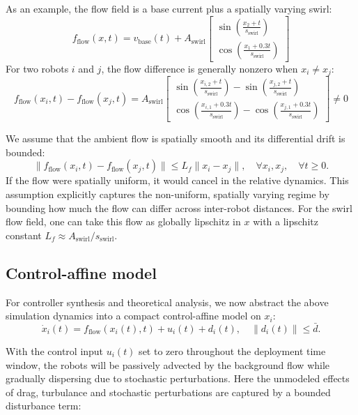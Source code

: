 \documentclass[conference]{IEEEconf}
\theoremstyle{plain}
\begin{document}
As an example, the flow field is a base current plus a spatially varying swirl:
\begin{equation*}
f_{\text{flow}}(x,t) = v_{\text{base}}(t) + A_{\text{swirl}}
\begin{bmatrix}
    \sin \! \left( \tfrac{x_2 + t}{s_{\text{swirl}}} \right) \\
    \cos \! \left( \tfrac{x_1 + 0.3t}{s_{\text{swirl}}} \right)
\end{bmatrix}
\end{equation*}
For two robots $i$ and $j$, the flow difference is generally nonzero when $x_{i} \neq x_{j}$:
\begin{equation*}
f_{\text{flow}}(x_i, t) - f_{\text{flow}}(x_j, t) = A_{\text{swirl}}
\left[ \begin{smallmatrix}
    \sin \! \left( \frac{x_{i,2} + t}{s_{\text{swirl}}} \right) - \sin \! \left( \frac{x_{j,2} + t}{s_{\text{swirl}}} \right) \\
    \cos \! \left( \frac{x_{i,1} + 0.3t}{s_{\text{swirl}}} \right) - \cos \! \left( \frac{x_{j,1} + 0.3t}{s_{\text{swirl}}} \right)
\end{smallmatrix} \right] \neq 0
\end{equation*}

We assume that the ambient flow is spatially smooth and its differential drift is bounded:
$$
\|f_{\text{flow}}(x_i, t) - f_{\text{flow}}(x_j, t)\| \le L_f \|x_i - x_j\|, \quad \forall x_i, x_j, \quad \forall t \ge 0.
$$
If the flow were spatially uniform, it would cancel in the relative dynamics. This assumption explicitly captures the non-uniform, spatially varying regime by bounding how much the flow can differ across inter-robot distances. For the swirl flow field, one can take this flow as globally lipschitz in $x$ with a lipschitz constant $L_f \approx A_{\text{swirl}} / s_{\text{swirl}}$.

\subsection{Control-affine model}
For controller synthesis and theoretical analysis, we now abstract the above simulation dynamics into a compact control-affine model on $x_i$:
\begin{equation}\label{eq:adv-dif}
\dot{x}_i(t) = f_{\text{flow}}(x_i(t),t) + u_i(t) + d_i(t), \quad \|d_i(t)\|\le \bar d.
\end{equation}

With the control input $u_i(t)$ set to zero throughout the deployment time window, the robots will be passively advected by the background flow while gradually dispersing due to stochastic perturbations. Here the unmodeled effects of drag, turbulance and stochastic perturbations are captured by a bounded disturbance term:
\end{document}
